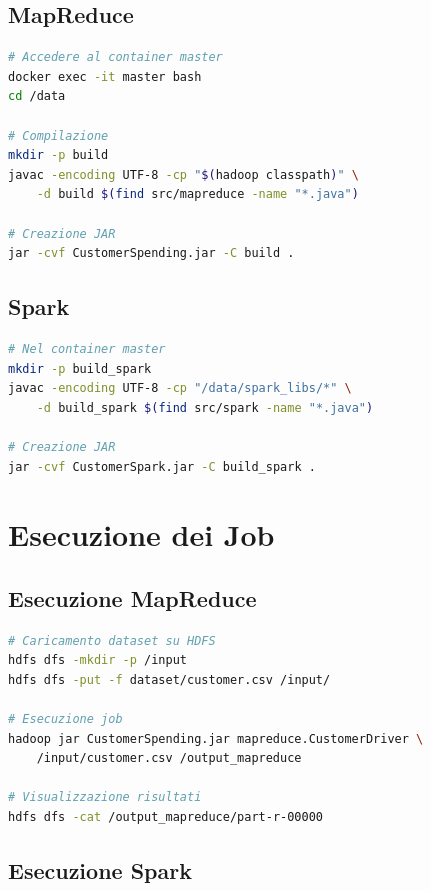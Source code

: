 \documentclass[a4paper, 12pt, oneside]{report}
\begin{document}
\subsection{MapReduce}

\begin{lstlisting}[language=bash,caption=Compilazione MapReduce]
# Accedere al container master
docker exec -it master bash
cd /data

# Compilazione
mkdir -p build
javac -encoding UTF-8 -cp "$(hadoop classpath)" \
    -d build $(find src/mapreduce -name "*.java")

# Creazione JAR
jar -cvf CustomerSpending.jar -C build .
\end{lstlisting}

\subsection{Spark}

\begin{lstlisting}[language=bash,caption=Compilazione Spark]
# Nel container master
mkdir -p build_spark
javac -encoding UTF-8 -cp "/data/spark_libs/*" \
    -d build_spark $(find src/spark -name "*.java")

# Creazione JAR
jar -cvf CustomerSpark.jar -C build_spark .
\end{lstlisting}

\section{Esecuzione dei Job}

\subsection{Esecuzione MapReduce}

\begin{lstlisting}[language=bash,caption=Esecuzione job MapReduce]
# Caricamento dataset su HDFS
hdfs dfs -mkdir -p /input
hdfs dfs -put -f dataset/customer.csv /input/

# Esecuzione job
hadoop jar CustomerSpending.jar mapreduce.CustomerDriver \
    /input/customer.csv /output_mapreduce

# Visualizzazione risultati
hdfs dfs -cat /output_mapreduce/part-r-00000
\end{lstlisting}

\subsection{Esecuzione Spark}
\end{document}
